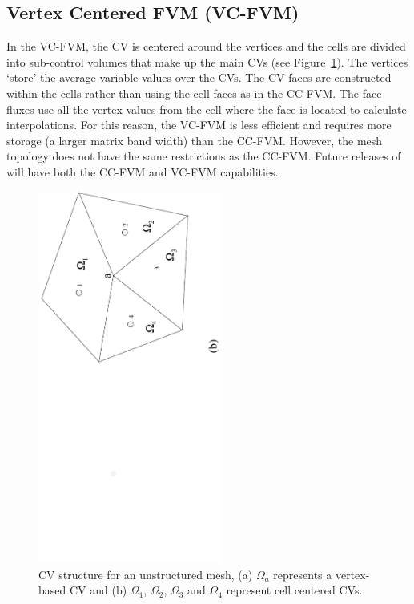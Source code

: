 \subsection{Vertex Centered FVM (VC-FVM)}

In the VC-FVM, the CV is centered around the vertices and the cells are
divided into sub-control volumes that make up the main CVs (see
Figure~\ref{fig:vc-cc-fv}).  The vertices `store' the average variable
values over the CVs.  The CV faces are constructed within the cells
rather than using the cell faces as in the CC-FVM. The face fluxes use
all the vertex values from the cell where the face is located to
calculate interpolations.  For this reason, the VC-FVM is less
efficient and requires more storage (a larger matrix band width) than
the CC-FVM. However, the mesh topology does not have the same
restrictions as the CC-FVM. Future releases of \FiPy{} will have both
the CC-FVM and VC-FVM capabilities.

\begin{figure}
\begin{center}
 \includegraphics[width=6cm,angle=-90]{numerical/vc-cc-fv.pdf}
 \caption{CV structure for an unstructured mesh, (a) $\Omega_a$
 represents a vertex-based CV and (b) $\Omega_1$, $\Omega_2$,
 $\Omega_3$ and $\Omega_4$ represent cell centered CVs. }
 \label{fig:vc-cc-fv}
\end{center}
\end{figure}

